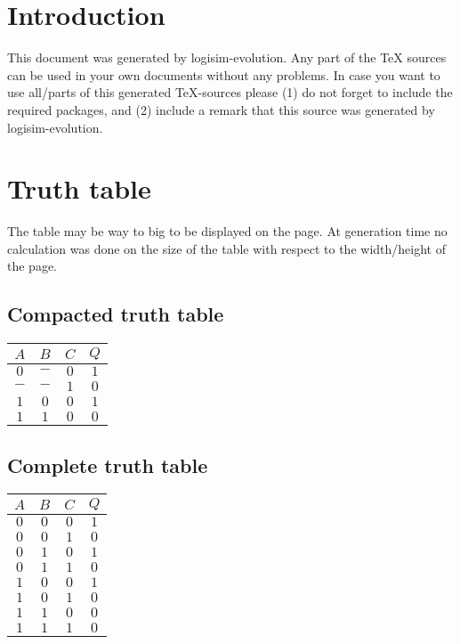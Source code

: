 \documentclass [15pt,a4paper,twoside]{article}
\begin{document}
\section{Introduction}
This document was generated by logisim-evolution. Any part of the TeX sources can be used in your own documents without any problems. In case you want to use all/parts of this generated TeX-sources please (1) do not forget to include the required packages, and (2) include a remark that this source was generated by logisim-evolution.
\section{Truth table}
The table may be way to big to be displayed on the page. At generation time no calculation was done on the size of the table with respect to the width/height of the page.
\subsection{Compacted truth table}
\begin{center}
\begin{tabular}{ccc|c}
$A$&$B$&$C$&$Q$\\
\hline
$0$&$-$&$0$&$1$\\
$-$&$-$&$1$&$0$\\
$1$&$0$&$0$&$1$\\
$1$&$1$&$0$&$0$\\

\end{tabular}
\end{center}
\subsection{Complete truth table}
\begin{center}
\begin{tabular}{ccc|c}
$A$&$B$&$C$&$Q$\\
\hline
$0$&$0$&$0$&$1$\\
$0$&$0$&$1$&$0$\\
$0$&$1$&$0$&$1$\\
$0$&$1$&$1$&$0$\\
$1$&$0$&$0$&$1$\\
$1$&$0$&$1$&$0$\\
$1$&$1$&$0$&$0$\\
$1$&$1$&$1$&$0$\\

\end{tabular}
\end{center}
\end{document}
